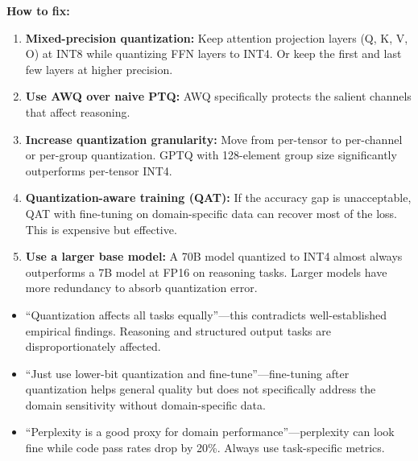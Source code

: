 \begin{interviewq}
\textbf{How to fix:}
\begin{enumerate}
    \item \textbf{Mixed-precision quantization:} Keep attention projection layers (Q, K, V, O) at INT8 while quantizing FFN layers to INT4. Or keep the first and last few layers at higher precision.
    \item \textbf{Use AWQ over naive PTQ:} AWQ specifically protects the salient channels that affect reasoning.
    \item \textbf{Increase quantization granularity:} Move from per-tensor to per-channel or per-group quantization. GPTQ with 128-element group size significantly outperforms per-tensor INT4.
    \item \textbf{Quantization-aware training (QAT):} If the accuracy gap is unacceptable, QAT with fine-tuning on domain-specific data can recover most of the loss. This is expensive but effective.
    \item \textbf{Use a larger base model:} A 70B model quantized to INT4 almost always outperforms a 7B model at FP16 on reasoning tasks. Larger models have more redundancy to absorb quantization error.
\end{enumerate}

\redflags
\begin{itemize}
    \item ``Quantization affects all tasks equally''---this contradicts well-established empirical findings. Reasoning and structured output tasks are disproportionately affected.
    \item ``Just use lower-bit quantization and fine-tune''---fine-tuning after quantization helps general quality but does not specifically address the domain sensitivity without domain-specific data.
    \item ``Perplexity is a good proxy for domain performance''---perplexity can look fine while code pass rates drop by 20\%. Always use task-specific metrics.
\end{itemize}



\end{interviewq}
